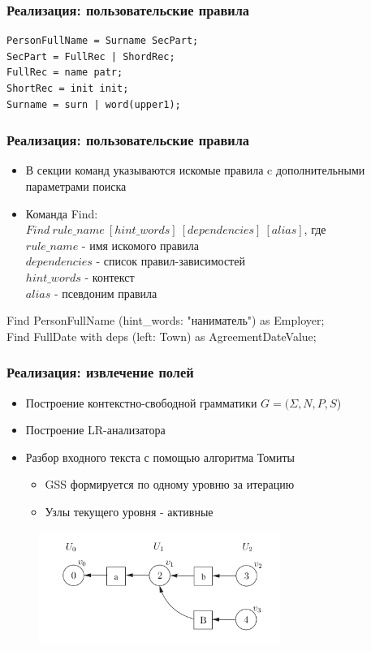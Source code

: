 \documentclass{beamer}
\begin{document}
\begin{frame}[fragile]
\frametitle{Реализация: пользовательские правила}
\begin{example}
\begin{verbatim}
PersonFullName = Surname SecPart;
SecPart = FullRec | ShordRec;
FullRec = name patr;
ShortRec = init init;
Surname = surn | word(upper1);
\end{verbatim}
\end{example}
\end{frame}

\begin{frame}[fragile]
\frametitle{Реализация: пользовательские правила}
\begin{itemize}
	\item В секции команд указываются искомые правила c дополнительными параметрами поиска
	\item Команда Find:\\ 
	$Find\ rule\_name\ [hint\_words]\ [dependencies]\ [alias]$, где\\
	$rule\_name$ - имя искомого правила\\
	$dependencies$ - список правил-зависимостей\\
	$hint\_words$ - контекст\\
	$alias$ - псевдоним правила
\end{itemize}
\begin{example}
Find PersonFullName (hint\_words: "наниматель") as Employer;\\
Find FullDate with deps (left: Town) as AgreementDateValue;
\end{example}
\end{frame}

\begin{frame}
\frametitle{Реализация: извлечение полей}
\begin{itemize}
	\item Построение контекстно-свободной грамматики $G = (\Sigma, N, P, S$)
	\item Построение LR-анализатора
	\item Разбор входного текста с помощью алгоритма Томиты
	\begin{itemize}
		\item GSS формируется по одному уровню за итерацию
		\item Узлы текущего уровня - активные
	\end{itemize}
\end{itemize}
\begin{figure}%
\centering
\includegraphics[width=0.7\textwidth]{img/gss-step3.png}
\end{figure}
\end{frame}
\end{document}
